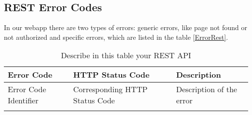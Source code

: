 \subsection{REST Error Codes}


In our webapp there are two types of errors: generic errors, 
like page not found or not authorized and specific errors, 
which are listed in the table \ref{ErrorRest}.

\begin{longtable}{|p{}|p{} |p{}|} 
\hline
\textbf{Error Code} & \textbf{HTTP Status Code} & \textbf{Description} \\\hline
Error Code Identifier & Corresponding HTTP Status Code &  Description of the error \\\hline
\caption{Describe in this table your REST API}
\label{tab:ErrorRest}
\end{longtable}